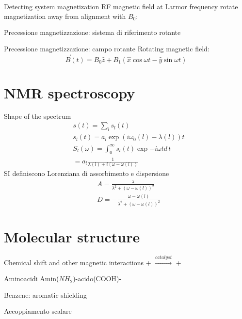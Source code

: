 \begin{frame}{Detecting system magnetization}
RF magnetic field at Larmor frequency rotate magnetization away from alignment with $B_0$:
\end{frame}

\begin{frame}{Precessione magnetizzazione: sistema di riferimento rotante}

\end{frame}

\begin{frame}{Precessione magnetizzazione: campo rotante}
   Rotating magnetic field:
   \begin{equation*}
   \vec{B}(t)=B_0\hat{z}+B_1(\hat{x}\cos{\omega t}-\hat{y}\sin{\omega t})
   \end{equation*}
\end{frame}

\section{NMR spectroscopy}

\begin{frame}{Shape of the spectrum}
    \begin{align*}
&s(t)=\sum_ls_l(t)\\
&s_l(t)=a_l\exp{(i\omega_0(l)-\lambda(l))t}\\
&S_l(\omega)=\int_0^{\infty}s_l(t)\exp{-i\omega t}d\,t\\
&=a_l\frac{1}{\lambda(l)+i(\omega-\omega(l))}
    \end{align*}
    SI definiscono Lorenziana di assorbimento e dispersione
    \begin{align*}
    &A=\frac{\lambda}{\lambda^2+(\omega-\omega(l))^2}\\
    &D=-\frac{\omega-\omega(l)}{\lambda^2+(\omega-\omega(l))^2}
    \end{align*}
\end{frame}

\section{Molecular structure}

\begin{frame}{Chemical shift and other magnetic interactions}
 \hspace{.5mm} + \hspace{.5mm}  \hspace{.5cm} $\xrightarrow{catalyst}$ \hspace{.5mm}  \hspace{.5mm} + \hspace{.5mm} 
\end{frame}

\begin{frame}{Aminoacidi}
Amin($NH_2$)-acido(COOH)-
\end{frame}

\begin{frame}{Benzene: aromatic shielding}
    
\end{frame}

\begin{frame}{Accoppiamento scalare}
    
\end{frame}